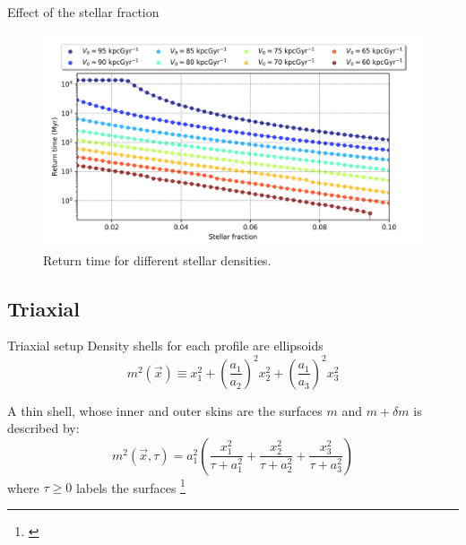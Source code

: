 \documentclass{beamer}
\newcommand\blfootnote[1]
{%
	\begingroup
	\renewcommand\thefootnote{}\footnote{#1}%
	\addtocounter{footnote}{-1}%
	\endgroup
}
\newcommand{\fcite}[1]{\blfootnote{\tiny\cite{#1}}}
\begin{document}
\begin{frame}{Effect of the stellar fraction}
	\begin{figure}[h]
		\centering
		\includegraphics[width=0.9\linewidth]{"../Files/Week 7/Symmetric/returntimes_stellar_speed"}
		\caption{Return time for different stellar densities.}
	\end{figure}
\end{frame}

\subsection{Triaxial}
\begin{frame}{Triaxial setup}
	Density shells for each profile are ellipsoids
	\begin{equation}
	m^2(\vec{x}) \equiv x_1^2 + \left(\dfrac{a_1}{a_2}\right)^2x_2^2 + \left(\dfrac{a_1}{a_3}\right)^2x_3^2
	\end{equation}
	
	A thin shell, whose inner and outer skins are the surfaces $m$ and $m + \delta m$ is described by:
	\begin{equation}\label{eq: m2}
	m^2(\vec{x}, \tau) = a_1^2\left(\frac{x_1^{2}}{\tau + a_{1}^{2}} + \frac{x_2^{2}}{\tau + a_{2}^{2}} + \frac{x_3^{2}}{\tau + a_{3}^{2}}\right)
	\end{equation}
	where $\tau \geq 0$ labels the surfaces \fcite{binney2011galactic}
\end{frame}
\end{document}

